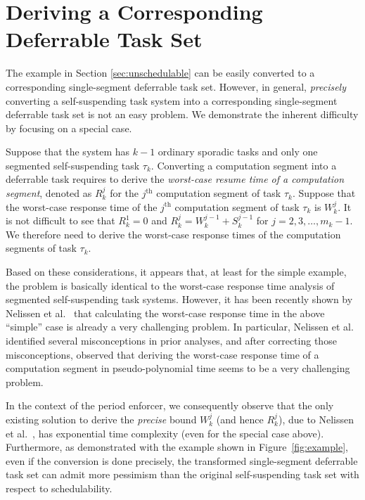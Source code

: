 
\section{Deriving a Corresponding Deferrable Task Set}
\label{sec:convert}

The example in Section \ref{sec:unschedulable} can be easily converted to a corresponding single-segment deferrable task set. However, in general,  \emph{precisely} converting a self-suspending task system into a corresponding single-segment  deferrable task set is not an easy problem. We demonstrate the inherent difficulty by focusing on a special case.

Suppose that the system has $k-1$ ordinary sporadic tasks and only one segmented self-suspending task $\tau_k$. Converting a computation segment into a deferrable task requires to derive the \emph{worst-case resume time of a computation segment}, denoted as $R_k^j$ for the $j^{\mathrm{th}}$ computation segment of task $\tau_k$. Suppose that the worst-case response time of the $j^{\mathrm{th}}$ computation segment of task $\tau_k$ is $W_k^j$. It is not difficult to see that $R_k^1=0$ and $R_k^j = W_k^{j-1}+S_k^{j-1}$ for $j=2,3,\ldots,m_k-1$. We therefore need to derive the worst-case response times of the computation segments of task $\tau_k$. 

Based on these considerations, it appears that, at least for the simple example,  the problem is basically identical to the worst-case response time analysis of segmented self-suspending task systems.  However, it has been recently shown by Nelissen et al.\ \cite{ecrts15nelissen} that calculating the worst-case response time in the above ``simple'' case is already a very challenging problem. In particular, Nelissen et al.\ \cite{ecrts15nelissen} identified several misconceptions in prior analyses, and after correcting those misconceptions, observed that deriving the worst-case response time of a computation segment in pseudo-polynomial time seems to be a very challenging problem. 



In the context of the period enforcer, we consequently observe that the only existing solution to derive the \emph{precise} bound $W_k^{j}$ (and hence $R_k^j$), due to Nelissen et al.\ \cite{ecrts15nelissen},  has exponential time complexity (even for the special case above). Furthermore, as demonstrated with the example shown in Figure~\ref{fig:example}, even if the conversion is done precisely, the transformed single-segment deferrable task set can admit more pessimism than the original self-suspending task set with respect to schedulability.
